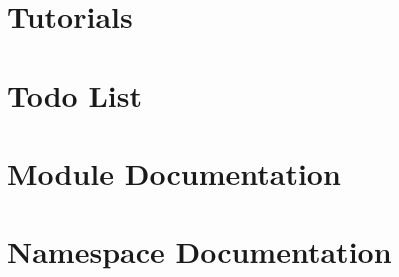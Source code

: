 \documentclass[a4paper]{book}
\begin{document}
\chapter{Tutorials}
\label{tutorials_page}

\chapter{Todo List}
\label{todo}

\chapter{Module Documentation}






\chapter{Namespace Documentation}




\end{document}
